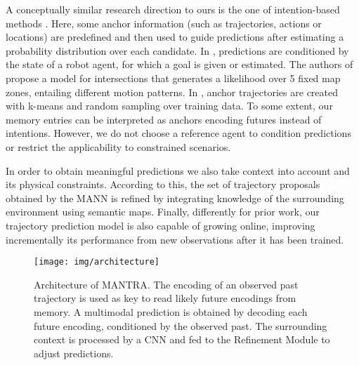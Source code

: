 \documentclass[10pt,twocolumn,letterpaper]{article}
\begin{document}
A conceptually similar research direction to ours is the one of intention-based methods \cite{rhinehart2019precog, choi2019drogon, chai2019multipath}. Here, some anchor information (such as trajectories, actions or locations) are predefined and then used to guide predictions after estimating a probability distribution over each candidate.
In \cite{rhinehart2019precog}, predictions are conditioned by the state of a robot agent, for which a goal is given or estimated. The authors of \cite{choi2019drogon} propose a model for intersections that generates a likelihood over 5 fixed map zones, entailing different motion patterns. In \cite{chai2019multipath}, anchor trajectories are created with k-means and random sampling over training data.
To some extent, our memory entries can be interpreted as anchors encoding futures instead of intentions. However, we do not choose a reference agent to condition predictions or restrict the applicability to constrained scenarios.

In order to obtain meaningful predictions we also take context into account and its physical constraints. According to this, the set of trajectory proposals obtained by the MANN is refined by integrating knowledge of the surrounding environment using semantic maps. 
Finally, differently for prior work, our trajectory prediction model is also capable of growing online, improving incrementally its performance from new observations after it has been trained.



\begin{figure*}[ht]
	\centering
	\texttt{[image: img/architecture]}
	\caption{Architecture of MANTRA. The encoding of an observed past trajectory is used as key to read likely future encodings from memory. A multimodal prediction is obtained by decoding each future encoding, conditioned by the observed past. The surrounding context is processed by a CNN and fed to the Refinement Module to adjust predictions.}
	\label{fig:architecture}
\end{figure*}
\vspace{-10pt}
\end{document}
